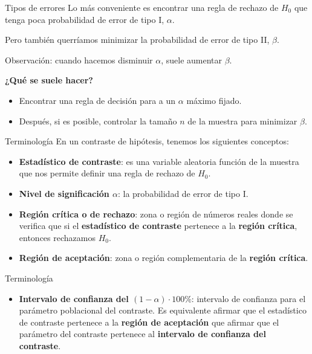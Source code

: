 \documentclass[
  ignorenonframetext,
]{beamer}
\providecommand{\tightlist}{%
  \setlength{\itemsep}{0pt}\setlength{\parskip}{0pt}}
\begin{document}
\begin{frame}{Tipos de errores}
\protect\hypertarget{tipos-de-errores-3}{}
Lo más conveniente es encontrar una regla de rechazo de \(H_{0}\) que
tenga poca probabilidad de error de tipo I, \(\alpha\).

Pero también querríamos minimizar la probabilidad de error de tipo II,
\(\beta\).

Observación: cuando hacemos disminuir \(\alpha\), suele aumentar
\(\beta\).

\textbf{¿Qué se suele hacer?}

\begin{itemize}[<+->]
\tightlist
\item
  Encontrar una regla de decisión para a un \(\alpha\) máximo fijado.
\item
  Después, si es posible, controlar la tamaño \(n\) de la muestra para
  minimizar \(\beta\).
\end{itemize}
\end{frame}

\begin{frame}{Terminología}
\protect\hypertarget{terminologuxeda}{}
En un contraste de hipótesis, tenemos los siguientes conceptos:

\begin{itemize}[<+->]
\item
  \textbf{Estadístico de contraste}: es una variable aleatoria función
  de la muestra que nos permite definir una regla de rechazo de
  \(H_{0}\).
\item
  \textbf{Nivel de significación \(\alpha\)}: la probabilidad de error
  de tipo I.
\item
  \textbf{Región crítica o de rechazo}: zona o región de números reales
  donde se verifica que si el \textbf{estadístico de contraste}
  pertenece a la \textbf{región crítica}, entonces rechazamos \(H_{0}\).
\item
  \textbf{Región de aceptación}: zona o región complementaria de la
  \textbf{región crítica}.
\end{itemize}
\end{frame}

\begin{frame}{Terminología}
\protect\hypertarget{terminologuxeda-1}{}
\begin{itemize}[<+->]
\tightlist
\item
  \textbf{Intervalo de confianza del \((1-\alpha)\cdot 100\%\)}:
  intervalo de confianza para el parámetro poblacional del contraste. Es
  equivalente afirmar que el estadístico de contraste pertenece a la
  \textbf{región de aceptación} que afirmar que el parámetro del
  contraste pertenece al \textbf{intervalo de confianza del contraste}.
\end{itemize}
\end{frame}
\end{document}
